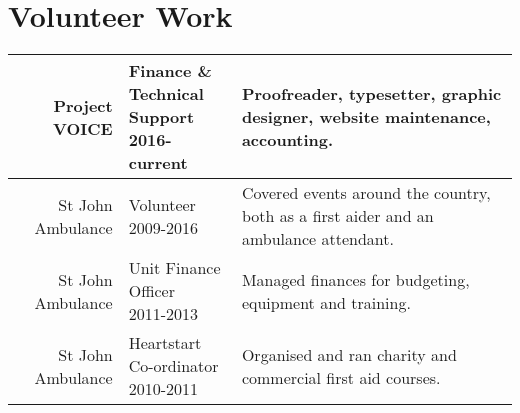 \documentclass[letterpaper]{deedy-resume-openfont} %
\begin{document}
\begin{minipage}[t]{\textwidth} %

\section{Volunteer Work} 

\begin{tabular}{rlm{12cm}}
Project VOICE & \makecell[l]{Finance \& \\ Technical Support \\  2016-current} & Proofreader, typesetter, graphic designer, website maintenance, accounting. \\
\hline
St John Ambulance & \makecell[l]{Volunteer \\ 2009-2016} & Covered events around the country, both as a first aider and an ambulance attendant. \\
\hline
St John Ambulance & \makecell[l]{Unit Finance \\ Officer \\ 2011-2013} &
Managed finances for budgeting, equipment and training. \\
\hline
St John Ambulance & \makecell[l]{Heartstart \\ Co-ordinator \\ 2010-2011} &
Organised and ran charity and commercial first aid courses. \\
\end{tabular}



\end{minipage} %








\end{document}
